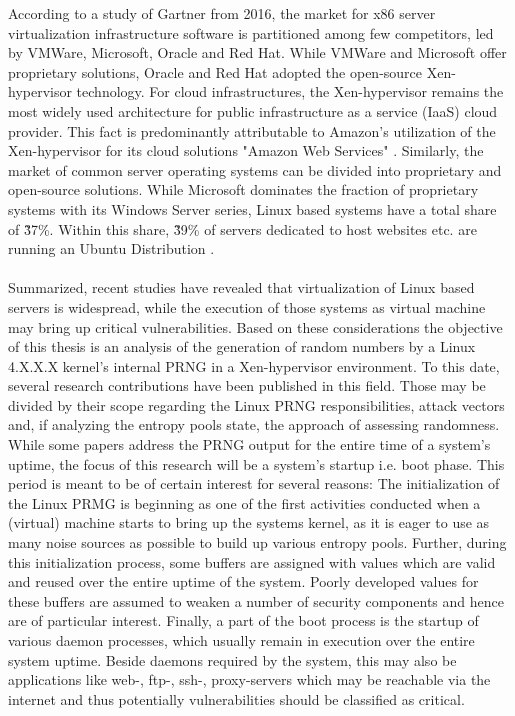 According to a study of Gartner from 2016, the market for x86 server virtualization infrastructure software is partitioned among few competitors, led by VMWare, Microsoft, Oracle and Red Hat. While VMWare and Microsoft offer proprietary solutions, Oracle and Red Hat adopted the open-source Xen-hypervisor technology. For cloud infrastructures, the Xen-hypervisor remains the most widely used architecture for public infrastructure as a service (IaaS) cloud provider. This fact is predominantly attributable to Amazon's utilization of the Xen-hypervisor for its cloud solutions "Amazon Web Services" \cite{bittman2016magic}. Similarly, the market of common server operating systems can be divided into proprietary and open-source solutions. While Microsoft dominates the fraction of proprietary systems with its Windows Server series, Linux based systems have a total share of \~37\%. Within this share, \~39\% of servers dedicated to host websites etc. are running an Ubuntu Distribution \cite{statsharelinux} . \\~\\
Summarized, recent studies have revealed that virtualization of Linux based servers is widespread, while the execution of those systems as virtual machine may bring up critical vulnerabilities. Based on these considerations the objective of this thesis is an analysis of the generation of random numbers by a Linux 4.X.X.X kernel's internal PRNG in a Xen-hypervisor environment. To this date, several research contributions have been published in this field. Those may be divided by their scope regarding the Linux PRNG responsibilities, attack vectors and, if analyzing the entropy pools state, the approach of assessing randomness. While some papers address the PRNG output for the entire time of a system's uptime, the focus of this research will be a system's startup i.e. boot phase. This period is meant to be of certain interest for several reasons: The initialization of the Linux PRMG is beginning as one of the first activities conducted when a (virtual) machine starts to bring up the systems kernel, as it is eager to use as many noise sources as possible to build up various entropy pools. Further, during this initialization process, some buffers are assigned with values which are valid and reused over the entire uptime of the system. Poorly developed values for these buffers are assumed to weaken a number of security components and hence are of particular interest. Finally, a part of the boot process is the startup of various daemon processes, which usually remain in execution over the entire system uptime. Beside daemons required by the system, this may also be applications like web-, ftp-, ssh-, proxy-servers which may be reachable via the internet and thus potentially vulnerabilities should be classified as critical.
